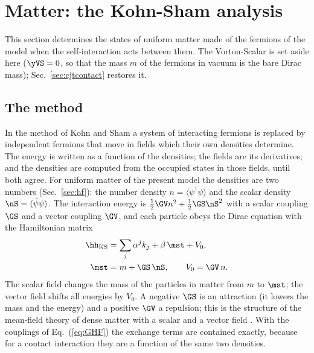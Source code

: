 \section{Matter: the Kohn-Sham analysis}
\label{sec:ks}

This section determines the states of uniform matter made of the fermions of the model when the
self-interaction acts between them. The Vorton-Scalar is set aside here ($\yVS=0$, so that the mass
$m$ of the fermions in vacuum is the bare Dirac mass); Sec.~\ref{sec:cjtcontact} restores it.

\subsection{The method}
\label{sec:ksmethod}

In the method of Kohn and Sham \cite{KohnSham1965} a system of interacting fermions is replaced by
independent fermions that move in fields which their own densities determine. The energy is written
as a function of the densities; the fields are its derivatives; and the densities are computed from
the occupied states in those fields, until both agree. For uniform matter of the present model the
densities are two numbers (Sec.~\ref{sec:hf}): the number density $n=\langle\psi^\dagger\psi\rangle$
and the scalar density $\nS=\langle\bar\psi\psi\rangle$. The interaction energy is
$\tfrac12\GV n^{2}+\tfrac12\GS\nS^{2}$ with a scalar coupling $\GS$ and a vector coupling $\GV$, and
each particle obeys the Dirac equation with the Hamiltonian matrix
\begin{equation}
\begin{aligned}
\hh_{\mathrm{KS}}&=\sum_j\alpha^{j}k_j+\beta\,\mst+V_0,\\
\mst&=m+\GS\,\nS,\qquad V_0=\GV\,n .
\end{aligned}
\label{eq:hKS}
\end{equation}
The scalar field changes the mass of the particles in matter from $m$ to $\mst$; the vector field
shifts all energies by $V_0$. A negative $\GS$ is an attraction (it lowers the mass and the energy)
and a positive $\GV$ a repulsion; this is the structure of the mean-field theory of dense matter
with a scalar and a vector field \cite{Walecka1974}. With the couplings of Eq.~(\ref{eq:GHF}) the exchange terms are
contained exactly, because for a contact interaction they are a function of the same two densities.

